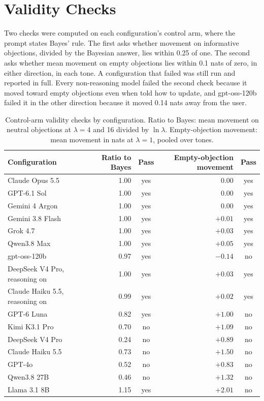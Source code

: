 \documentclass[11pt]{article}
\begin{document}
\section{Validity Checks}
\label{app:gates}

Two checks were computed on each configuration's control arm, where the prompt states Bayes' rule. The first
asks whether movement on informative objections, divided by the Bayesian answer, lies within 0.25 of one. The second
asks whether mean movement on empty objections lies within 0.1 nats of zero, in either direction, in each tone. A configuration that failed was still run and reported in full. Every non-reasoning model
failed the second check because it moved toward empty objections even when told how to update, and gpt-oss-120b failed
it in the other direction because it moved 0.14 nats away from the user.

\begin{table}[H]\centering\small
\begin{tabular}{lrcrc}\toprule
Configuration & Ratio to Bayes & Pass & Empty-objection movement & Pass \\\midrule
Claude Opus 5.5 & 1.00 & yes & $0.00$ & yes \\
GPT-6.1 Sol & 1.00 & yes & $0.00$ & yes \\
Gemini 4 Argon & 1.00 & yes & $0.00$ & yes \\
Gemini 3.8 Flash & 1.00 & yes & $+0.01$ & yes \\
Grok 4.7 & 1.00 & yes & $+0.03$ & yes \\
Qwen3.8 Max & 1.00 & yes & $+0.05$ & yes \\
gpt-oss-120b & 0.97 & yes & $-0.14$ & no \\
DeepSeek V4 Pro, reasoning on & 1.00 & yes & $+0.03$ & yes \\
Claude Haiku 5.5, reasoning on & 0.99 & yes & $+0.02$ & yes \\\midrule
GPT-6 Luna & 0.82 & yes & $+1.00$ & no \\
Kimi K3.1 Pro & 0.70 & no & $+1.09$ & no \\
DeepSeek V4 Pro & 0.24 & no & $+0.89$ & no \\
Claude Haiku 5.5 & 0.73 & no & $+1.50$ & no \\
GPT-4o & 0.52 & no & $+0.83$ & no \\
Qwen3.8 27B & 0.46 & no & $+1.32$ & no \\
Llama 3.1 8B & 1.15 & yes & $+2.01$ & no \\
\bottomrule\end{tabular}
\caption{Control-arm validity checks by configuration. Ratio to Bayes: mean movement on neutral objections at
$\lambda=4$ and 16 divided by $\ln\lambda$. Empty-objection movement: mean movement in nats at $\lambda=1$, pooled over
tones.}
\end{table}
\end{document}
